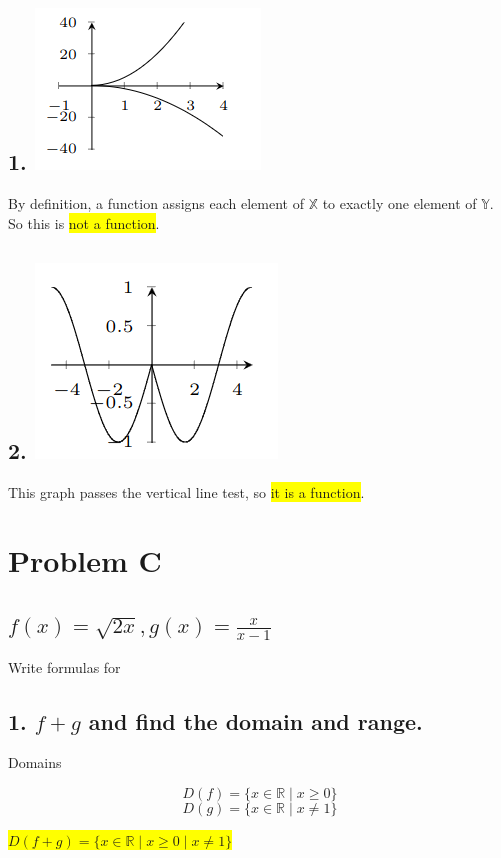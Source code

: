 \documentclass{article}
\begin{document}
\subsection*{1. \includegraphics[width=0.35\linewidth]{plots/image.png}}

By definition, a function assigns each element of $\mathbb{X}$ to exactly one element of $\mathbb{Y}$. So this is \colorbox{yellow}{not a function}. \\

\subsection*{2. \includegraphics[width=0.35\linewidth]{plot2.png} }

This graph passes the vertical line test, so \colorbox{yellow}{it is a function}. 

\section*{Problem C}

\subsection*{$f(x) = \sqrt{2x}, g(x) = \frac{x}{x-1}$}
Write formulas for
\subsection*{1. $f + g$ and find the domain and range.}

Domains

\[
D(f) = \{ x \in \mathbb{R} \mid x \geq 0 \}
\]
\[
D(g) = \{ x \in \mathbb{R} \mid x \neq 1 \}
\]
\begin{center}
\colorbox{yellow}{$D(f+g) = \{ x \in \mathbb{R} \mid x \geq 0 \mid x \neq 1 \}$}
\end{center}
\end{document}
